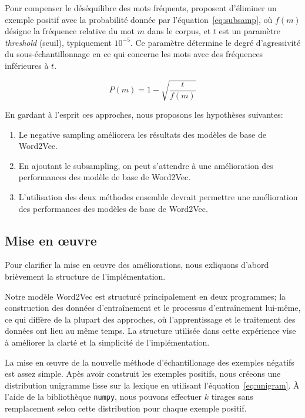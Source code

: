 \documentclass[12pt]{article}
\begin{document}
Pour compenser le déséquilibre des mots fréquents, \cite{DBLP:conf/nips/MikolovSCCD13} proposent d'éliminer un exemple positif avec la probabilité donnée par l'équation~\ref{eq:subsamp}, où $f(m)$ désigne la fréquence relative du mot $m$ dans le corpus, et $t$ est un paramètre \textit{threshold} (seuil), typiquement $10^{-5}$. Ce paramètre détermine le degré d'agressivité du sous-échantillonnage en ce qui concerne les mots avec des fréquences inférieures à $t$.

\begin{equation}\label{eq:subsamp}
P(m) = 1 - \sqrt{\frac{t}{f(m)}}
\end{equation}

En gardant à l'esprit ces approches, nous proposons les hypothèses suivantes:

\begin{enumerate}
    \item Le negative sampling améliorera les résultats des modèles de base de Word2Vec.
    \item En ajoutant le subsampling, on peut s'attendre à une amélioration des performances des modèle de base de Word2Vec.
    \item L'utilisation des deux méthodes ensemble devrait permettre une amélioration des performances des modèles de base de Word2Vec.
\end{enumerate}

\subsection{Mise en œuvre} \label{mise en œuvre-1}

Pour clarifier la mise en œuvre des améliorations, nous exliquons d'abord brièvement la structure de l'implémentation. 

Notre modèle Word2Vec est structuré principalement en deux programmes; la construction des données d'entraînement et le processus d'entraînement lui-même, ce qui diffère de la plupart des approches, où l'apprentissage et le traitement des données ont lieu au même temps. La structure utilisée dans cette expérience vise à améliorer la clarté et la simplicité de l'implémentation.

La mise en œuvre de la nouvelle méthode d'échantillonage des exemples négatifs est assez simple. Apès avoir construit les exemples positifs, nous créeons une distribution unigramme lisse sur la lexique en utilisant l'équation~\ref{eq:unigram}. À l'aide de la bibliothèque \texttt{numpy}, nous pouvons effectuer $k$ tirages sans remplacement selon cette distribution pour chaque exemple positif.
\end{document}
